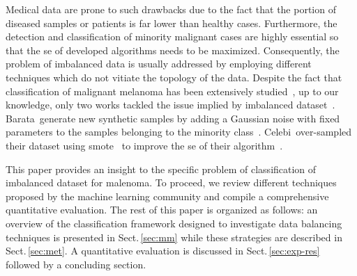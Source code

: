 Medical data are prone to such drawbacks due to the fact that the portion of diseased samples or patients is far lower than healthy cases.
Furthermore, the detection and classification of minority malignant cases are highly essential so that the \ac{se} of developed algorithms needs to be maximized.
Consequently, the problem of imbalanced data is usually addressed by employing different techniques which do not vitiate the topology of the data.
Despite the fact that classification of malignant melanoma has been extensively studied~\cite{rastgoo2015automatic}, up to our knowledge, only two works tackled the issue implied by imbalanced dataset~\cite{barata2013two,celebi2007methodological}.
Barata~\etal generate new synthetic samples by adding a Gaussian noise with fixed parameters to the samples belonging to the minority class~\cite{barata2013two}.
Celebi~\etal over-sampled their dataset using \ac{smote}~\cite{chawla2002smote} to improve the \ac{se} of their algorithm~\cite{celebi2007methodological}.

This paper provides an insight to the specific problem of classification of imbalanced dataset for malenoma. 
To proceed, we review different techniques proposed by the machine learning community and compile a comprehensive quantitative evaluation. The rest of this paper is organized as follows: an overview of the classification framework designed to investigate data balancing techniques is presented in Sect.\,\ref{sec:mm} while these strategies are described in Sect.\,\ref{sec:met}. A quantitative evaluation is discussed in Sect.\,\ref{sec:exp-res} followed by a concluding section.





